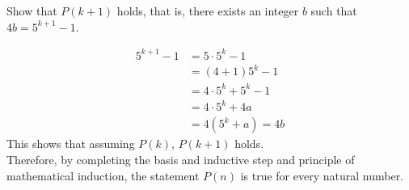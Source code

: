 \begin{questions}
\begin{solution}
Show that $P(k+1)$ holds, that is, there exists an integer $b$ such that $4b = 5^{k+1} - 1$. 

\begin{align*}
    5^{k+1} - 1 &= 5\cdot 5^{k} - 1 \\
     &= (4 + 1)5^{k} - 1 \\
     &= 4\cdot 5^{k} + 5^{k} - 1 \\
     &= 4\cdot 5^{k} + 4a \tag{Ind. Hyp.} \\
     &= 4(5^{k} + a)
     = 4b
\end{align*}
This shows that assuming $P(k)$, $P(k+1)$ holds. \\
Therefore, by completing the basis and inductive step and principle of mathematical induction, the statement $P(n)$ is true for every natural number.
\end{solution}


\end{questions}
